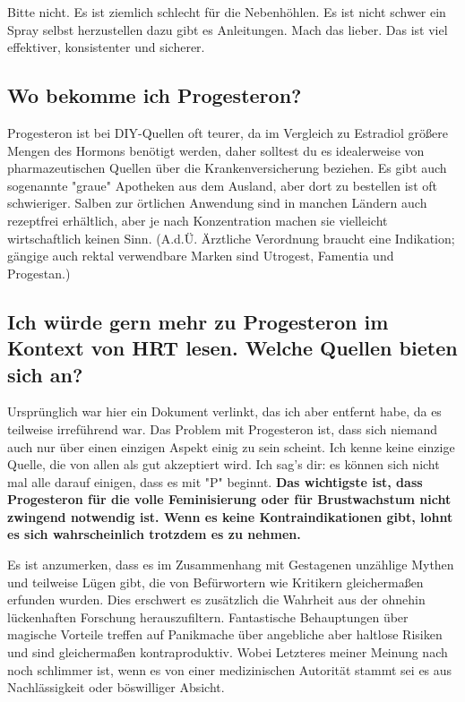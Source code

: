 \documentclass{article}
\begin{document}
Bitte nicht. Es ist ziemlich schlecht für die Nebenhöhlen. Es ist nicht schwer ein Spray selbst herzustellen dazu gibt es Anleitungen. Mach das lieber. Das ist viel effektiver, konsistenter und sicherer.

\subsection{Wo bekomme ich Progesteron?}

Progesteron ist bei DIY-Quellen oft teurer, da im Vergleich zu Estradiol größere Mengen des Hormons benötigt werden, daher solltest du es idealerweise von pharmazeutischen Quellen über die Krankenversicherung beziehen. Es gibt auch sogenannte "graue" Apotheken aus dem Ausland, aber dort zu bestellen ist oft schwieriger. Salben zur örtlichen Anwendung sind in manchen Ländern auch rezeptfrei erhältlich, aber je nach Konzentration machen sie vielleicht wirtschaftlich keinen Sinn.  (A.d.Ü. Ärztliche Verordnung braucht eine Indikation; gängige auch rektal verwendbare Marken sind Utrogest, Famentia und Progestan.)

\subsection{Ich würde gern mehr zu Progesteron im Kontext von HRT lesen. Welche Quellen bieten sich an?}\label{8-17}

Ursprünglich war hier ein Dokument verlinkt, das ich aber entfernt habe, da es teilweise irreführend war. Das Problem mit Progesteron ist, dass sich niemand auch nur über einen einzigen Aspekt einig zu sein scheint. Ich kenne keine einzige Quelle, die von allen als gut akzeptiert wird. Ich sag's dir: es können sich nicht mal alle darauf einigen, dass es mit "P" beginnt. \textbf{Das wichtigste ist, dass Progesteron für die volle Feminisierung oder für Brustwachstum nicht zwingend notwendig ist. Wenn es keine Kontraindikationen gibt, lohnt es sich wahrscheinlich trotzdem es zu nehmen.}

Es ist anzumerken, dass es im Zusammenhang mit Gestagenen unzählige Mythen und teilweise Lügen gibt, die von Befürwortern wie Kritikern gleichermaßen erfunden wurden. Dies erschwert es zusätzlich die Wahrheit aus der ohnehin lückenhaften Forschung herauszufiltern. Fantastische Behauptungen über magische Vorteile treffen auf Panikmache über angebliche aber haltlose Risiken und sind gleichermaßen kontraproduktiv. Wobei Letzteres meiner Meinung nach noch schlimmer ist, wenn es von einer medizinischen Autorität stammt \textemdash sei es aus Nachlässigkeit oder böswilliger Absicht.
\end{document}
